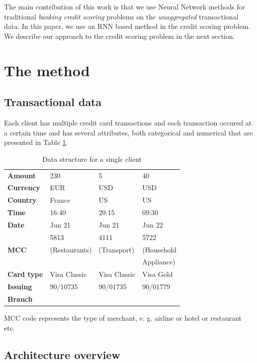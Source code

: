 \documentclass[sigconf]{acmart}
\begin{document}
The main contribution of this work is that we use Neural Network methods for traditional {\em banking credit scoring} problems on the {\em unaggregated} transactional data. 
In this paper, we use an RNN based method in the credit scoring problem. We describe our approach to the credit scoring problem in the next section.

\section{The method}

\subsection{Transactional data}

Each client has multiple credit card transactions and each transaction occured at a certain time and has several attributes, both categorical and numerical that are presented in Table \ref{tab-tr-data}. 

\begin{table}[ht]
\caption{Data structure for a single client}
\begin{tabular}{ | l |  l l l | }
\hline
\textbf{Amount} & 230 & 5 & 40 \\
\textbf{Currency} & EUR & USD & USD \\
\textbf{Country} & France & US & US \\
\textbf{Time} & 16:40 & 20:15 & 09:30 \\
\textbf{Date} & Jun 21 & Jun 21 & Jun 22 \\
 & 5813 & 4111 & 5722 \\
\textbf{MCC} & (Restaurants) & (Transport) & (Household \\
&  &  & Appliance) \\
\textbf{Card type} & Visa Classic & Visa Classic & Visa Gold \\
\textbf{Issuing} & 90/10735 & 90/01735 & 90/01779 \\
\textbf{Branch} &&& \\
\hline
\end{tabular}
\label{tab-tr-data}
\end{table}

MCC code represents the type of merchant, e. g. airline or hotel or restaurant etc.

\subsection{Architecture overview}
\end{document}
